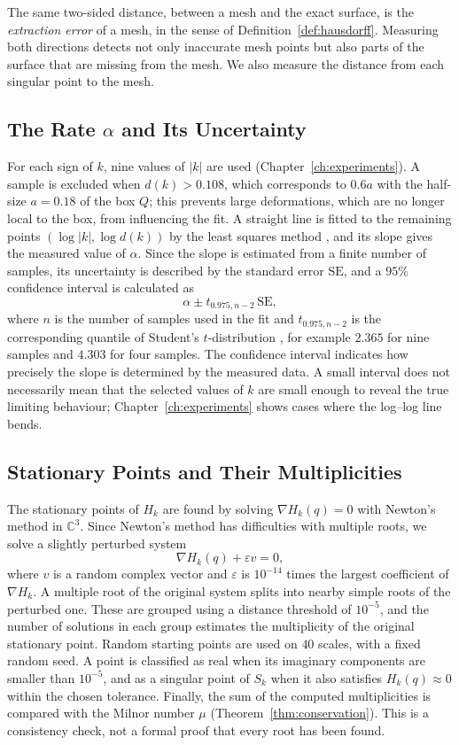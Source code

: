 \documentclass[12pt, a4paper, oneside]{book}
\theoremstyle{plain}
\theoremstyle{definition}
\theoremstyle{remark}
\theoremstyle{definition}
\begin{document}
The same two-sided distance, between a mesh and the exact surface, is the \emph{extraction error} of a mesh, in the sense of Definition~\ref{def:hausdorff}. Measuring both directions detects not only inaccurate mesh points but also parts of the surface that are missing from the mesh. We also measure the distance from each singular point to the mesh.

\subsection{The Rate $\alpha$ and Its Uncertainty}

For each sign of $k$, nine values of $|k|$ are used (Chapter~\ref{ch:experiments}). A sample is excluded when $d(k)>0.108$, which corresponds to $0.6a$ with the half-size $a=0.18$ of the box $Q$; this prevents large deformations, which are no longer local to the box, from influencing the fit. A straight line is fitted to the remaining points $(\log|k|,\log d(k))$ by the least squares method \cite{draper1998applied}, and its slope gives the measured value of $\alpha$. Since the slope is estimated from a finite number of samples, its uncertainty is described by the standard error $\mathrm{SE}$, and a $95\%$ confidence interval is calculated as
\[
\alpha\pm t_{0.975,n-2}\,\mathrm{SE},
\]
where $n$ is the number of samples used in the fit and $t_{0.975,n-2}$ is the corresponding quantile of Student's $t$-distribution \cite{draper1998applied}, for example $2.365$ for nine samples and $4.303$ for four samples. The confidence interval indicates how precisely the slope is determined by the measured data. A small interval does not necessarily mean that the selected values of $k$ are small enough to reveal the true limiting behaviour; Chapter~\ref{ch:experiments} shows cases where the log--log line bends.

\subsection{Stationary Points and Their Multiplicities}

The stationary points of $H_k$ are found by solving $\nabla H_k(q)=0$ with Newton's method in $\mathbb{C}^3$. Since Newton's method has difficulties with multiple roots, we solve a slightly perturbed system
\[
\nabla H_k(q)+\varepsilon v=0,
\]
where $v$ is a random complex vector and $\varepsilon$ is $10^{-14}$ times the largest coefficient of $\nabla H_k$. A multiple root of the original system splits into nearby simple roots of the perturbed one. These are grouped using a distance threshold of $10^{-5}$, and the number of solutions in each group estimates the multiplicity of the original stationary point. Random starting points are used on $40$ scales, with a fixed random seed. A point is classified as real when its imaginary components are smaller than $10^{-5}$, and as a singular point of $S_k$ when it also satisfies $H_k(q)\approx0$ within the chosen tolerance. Finally, the sum of the computed multiplicities is compared with the Milnor number $\mu$ (Theorem~\ref{thm:conservation}). This is a consistency check, not a formal proof that every root has been found.
\end{document}
